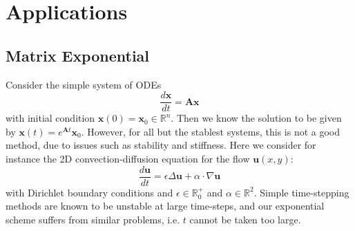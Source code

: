 \documentclass[11pt]{article}
\begin{document}
\section{Applications}
\subsection{Matrix Exponential}\label{sec:matrixexp}
Consider the simple system of ODEs
\begin{equation}\label{eq:ode}
    \frac{d\mathbf{x}}{dt} = \mathbf{A}\mathbf{x}
\end{equation}
with initial condition $\mathbf{x}(0) = \mathbf{x}_0\in\mathbb{R}^n$. Then we know the solution to be given by $\mathbf{x}(t)=e^{\mathbf{A}t}\mathbf{x}_0$. However, for all but the stablest systems, this is not a good method, due to issues such as stability and stiffness. Here we consider for instance the 2D convection-diffusion equation for the flow $\mathbf{u}(x,y)$:
$$\frac{d \mathbf{u}}{d t}=\epsilon\Delta\mathbf{u}+\alpha\cdot\nabla\mathbf{u}$$
with Dirichlet boundary conditions and $\epsilon\in\mathbb{R}^{+}_0$ and $\alpha\in\mathbb{R}^2$. Simple time-stepping methods are known to be unstable at large time-steps, and our exponential scheme suffers from similar problems, i.e. $t$ cannot be taken too large.
\end{document}

